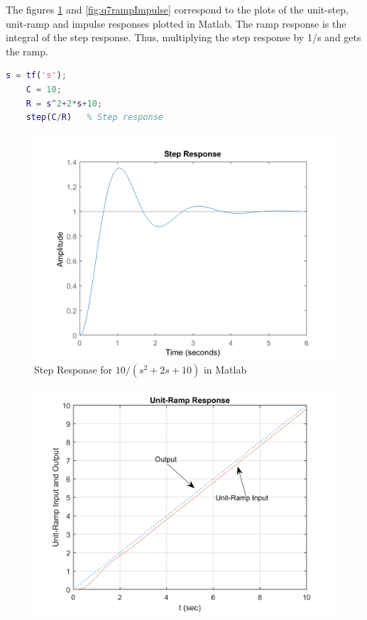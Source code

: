 \documentclass[12pt]{article}
\newenvironment{problem}[2][Problem]{\begin{trivlist}
		\item[\hskip \labelsep {\bfseries #1}\hskip \labelsep {\bfseries #2.}]}{\end{trivlist}}
\begin{document}
\begin{problem}{7 --- B-5-10 --- Matlab plotting} \hfill\newline
The figures \ref{fig:q7step} and \ref{fig:q7rampImpulse} correspond to the plots of the unit-step, unit-ramp and impulse responses plotted in Matlab. The ramp response is the integral of the step response. Thus, multiplying the step response by 1/s and gets the ramp.
\begin{lstlisting}[language = Matlab]
	s = tf('s');
	C = 10;
	R = s^2+2*s+10;
	step(C/R)   % Step response
\end{lstlisting}
\begin{figure}[H]
	\centering
	\includegraphics[width=0.5\linewidth]{Images/Q7Step}
	\caption{Step Response for $10 / (s^2+2s+10)$ in Matlab}
	\label{fig:q7step}
\end{figure}
\begin{figure}[H]
	\centering
	\begin{minipage}{.5\textwidth}
		\centering
		\includegraphics[width=1\linewidth]{Images/Q7RampOgata}
		\label{fig:q7ramp}

\end{minipage}
\end{figure}
\end{problem}
\end{document}
